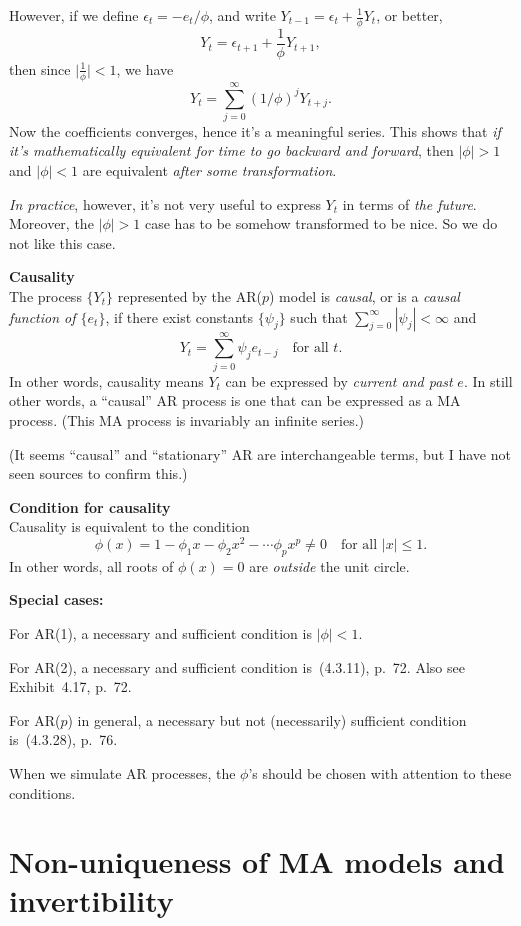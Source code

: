 \documentclass[12pt]{article}
\begin{document}
However, if we define
$\epsilon_t = -e_t /\phi$, and write
$Y_{t-1} = \epsilon_t + \frac{1}{\phi} Y_t$, or better,
\[
Y_t = \epsilon_{t+1} + \frac{1}{\phi} Y_{t+1}
,
\]
then since $\bigl|\frac{1}{\phi}\bigr| < 1$,
we have
\[
Y_t = \sum_{j=0}^{\infty} (1/\phi)^{j} Y_{t+j}.
\]
Now the coefficients converges,
hence it's a meaningful series.
This shows that
\emph{if it's mathematically equivalent for time
to go backward and forward},
then
$|\phi| > 1$ and $|\phi| < 1$
are equivalent \emph{after some transformation}.

\emph{In practice}, however, it's not very useful to
express $Y_t$ in terms of \emph{the future}.
Moreover,
the $|\phi| > 1$ case has to be somehow transformed to be nice.
So we do not like this case.

\textbf{Causality}\\
The process $\{Y_t\}$ represented by the AR($p$) model
is \emph{causal},
or is a \emph{causal function of $\{e_t\}$},
if there exist constants $\{\psi_j\}$ such that
$\sum_{j=0}^\infty |\psi_j| < \infty$ and
\[
Y_t = \sum_{j=0}^\infty \psi_j e_{t-j}
\quad
\text{for all $t$.}
\]
In other words,
causality means $Y_t$ can be expressed by \emph{current and past} $e$.
In still other words,
a ``causal'' AR process is one that can be expressed as
a MA process.
(This MA process is invariably an infinite series.)

(It seems ``causal'' and ``stationary'' AR are interchangeable terms,
but I have not seen sources to confirm this.)


\theorem
\textbf{Condition for causality}\\
Causality is equivalent to the condition
\[
\phi(x) = 1 - \phi_1x - \phi_2x^2 - \dotsb \phi_p x^p \ne 0
\quad
\text{for all $|x| \le 1$.}
\]
In other words,
all roots of $\phi(x) = 0$ are \emph{outside} the unit circle.


\textbf{Special cases:}

For AR(1), a necessary and sufficient condition is $|\phi| < 1$.

For AR(2), a necessary and sufficient condition is~(4.3.11), p.~72. Also
see Exhibit~4.17, p.~72.

For AR($p$) in general, a necessary but not (necessarily) sufficient
condition is~(4.3.28), p.~76.

When we simulate AR processes, the $\phi$'s should be chosen
with attention to these conditions.


\section{Non-uniqueness of MA models and invertibility}
\end{document}
